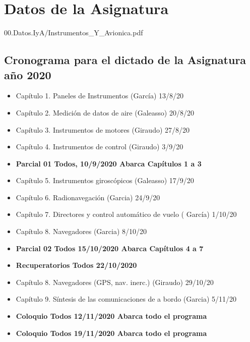 
\chapter*{Datos de la Asignatura}
\label{chap:00.datos.de.IyA}



  
  {00.Datos.IyA/Instrumentos_Y_Avionica.pdf}

\section*{Cronograma para el dictado de la Asignatura a\~no 2020}
\label{sec:00.cronograma}

  \begin{itemize}
  \item Capítulo 1. Paneles de Instrumentos (García) 13/8/20
  \item Capítulo 2. Medición de datos de aire (Galeasso) 20/8/20
  \item Capítulo 3. Instrumentos de motores (Giraudo) 27/8/20
  \item Capítulo 4. Instrumentos de control (Giraudo) 3/9/20
  \item \textbf{Parcial 01 Todos, 10/9/2020 Abarca Capítulos 1 a 3}
  \item Capítulo 5. Instrumentos giroscópicos (Galeasso) 17/9/20
  \item Capítulo 6. Radionavegación (Garcia) 24/9/20
  \item Capítulo 7. Directores y control automático de vuelo ( García)     1/10/20
  \item Capítulo 8. Navegadores (Garcia) 8/10/20
  \item {\bf Parcial 02 Todos 15/10/2020 Abarca Capítulos 4 a 7}
  \item \textbf{Recuperatorios Todos 22/10/2020}
  \item Capítulo 8. Navegadores (GPS, nav. inerc.) (Giraudo) 29/10/20
  \item Capítulo 9. Síntesis de las comunicaciones de a bordo (Garcia)     5/11/20
  \item \textbf{Coloquio Todos 12/11/2020 Abarca todo el programa}
  \item \textbf{Coloquio Todos 19/11/2020 Abarca todo el programa}
  \end{itemize}


